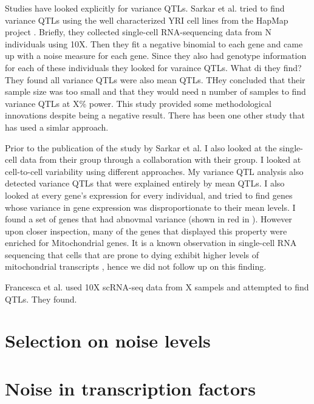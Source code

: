 Studies have looked explicitly for variance QTLs. Sarkar et al. tried to find variance QTLs using the well characterized YRI cell lines from the HapMap project \cite{hapmap}. Briefly, they collected single-cell RNA-sequencing data from N individuals using 10X. Then they fit a negative binomial to each gene and came up with a noise measure for each gene. Since they also had genotype information for each of these individuals they looked for varaince QTLs. What di they find? They found all variance QTLs were also mean QTLs. THey concluded that their sample size was too small and that they would need n number of samples to find variance QTLs at X\% power. This study provided some methodological innovations despite being a negative result. There has been one other study that has used a simlar approach.

Prior to the publication of the study by Sarkar et al. I also looked at the single-cell data from their group through a collaboration with their group. I looked at cell-to-cell variability using different approaches. My variance QTL analysis also detected variance QTLs that were explained entirely by mean QTLs. I also looked at every gene's expression for every individual, and tried to find genes whose variance in gene expression was disproportionate to their mean levels. I found a set of genes that had abnovmal variance (shown in red in ). However upon closer inspection, many of the genes that displayed this property were enriched for Mitochondrial genes. It is a known observation in single-cell 
RNA sequencing that cells that are prone to dying exhibit higher levels of mitochondrial transcripts \cite {seurat}, hence we did not follow up on this finding.



Francesca et al. used 10X scRNA-seq data from X sampels and attempted to find QTLs. They found. 


\section{Selection on noise levels}




\section{Noise in transcription factors}

